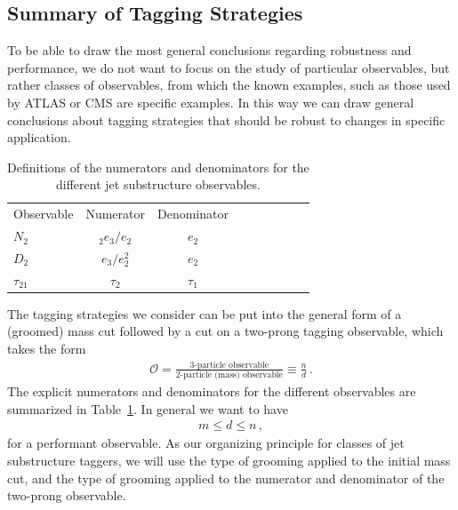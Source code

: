 \documentclass[11pt,letterpaper]{article}
\DeclareRobustCommand{\Tab}[1]{Table~\ref{#1}}
\newcommand{\ecfnobeta}[1]{e_{#1}}
\newcommand{\ecfvarnobeta}[2]{{_{#1}e_{#2}}}
\begin{document}
\subsection{Summary of Tagging Strategies}\label{sec:dichroic_sum}

To be able to draw the most general conclusions regarding robustness and performance, we do not want to focus on the study of particular observables, but rather classes of observables, from which the known examples, such as those used by ATLAS or CMS are specific examples. In this way we can draw general conclusions about tagging strategies that should be robust to changes in specific application.

\begin{table}
\begin{center}
\begin{tabular}{| l | c | c |c |c|c|c |c|r| }
  \hline                       
  Observable &  Numerator & Denominator \\
  $N_2$ &   $\ecfvarnobeta{2}{3} / \ecfnobeta{2} $ & $ \ecfnobeta{2}$ \\
  $D_2$ &   $\ecfnobeta{3} / \ecfnobeta{2}^2 $ & $ \ecfnobeta{2}$ \\
  $\tau_{21}$ &   $\tau_2$ & $\tau_1$ \\
  \hline  
\end{tabular}
\end{center}
\caption{
Definitions of the numerators and denominators for the different jet substructure observables.
}
\label{tab:dn}
\end{table}


The tagging strategies we consider can be put into the general form of a (groomed) mass cut followed by a cut on a two-prong tagging observable, which takes the form
\begin{align}
\mathcal{O}=\frac{\text{3-particle observable}}{\text{2-particle (mass) observable}} \equiv \frac{n}{d}\,.
\end{align}
The explicit numerators and denominators for the different observables are summarized in \Tab{tab:dn}. In general we want to have
\begin{align}
m \leq d \leq n\,,
\end{align}
for a performant observable.
As our organizing principle for classes of  jet substructure taggers, we will use the type of grooming applied to the initial mass cut, and the type of grooming applied to the numerator and denominator of the two-prong observable.
\end{document}
